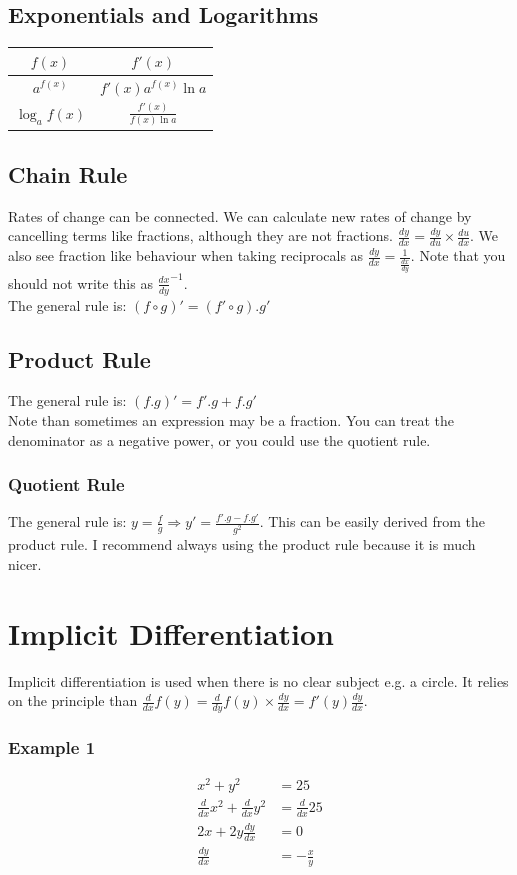 \documentclass[a4paper,12pt]{article}
\begin{document}
\subsection*{Exponentials and Logarithms}
\begin{tabular}{ c c }
\hline
	 $f(x)$ & $f'(x)$  \\ 
\hline
	$a^{f(x)}$ & $f'(x) a^{f(x)} \ln a$ \\
	$\log_a f(x)$ & $\frac{f'(x)}{f(x)\ln a}$	 \\
\hline
\end{tabular}
\subsection*{Chain Rule}
Rates of change can be connected. We can calculate new rates of change by cancelling terms like fractions, although they are not fractions. $\frac{dy}{dx} = \frac{dy}{du} \times \frac{du}{dx}$. We also see fraction like behaviour when taking reciprocals as $\frac{dy}{dx} = \frac{1}{\frac{dx}{dy}}$. Note that you should not write this as $\frac{dx}{dy}^{-1}$. \\
The general rule is: $(f \circ g)' = (f' \circ g).g'$
\subsection*{Product Rule}
The general rule is: $(f.g)' = f'.g + f.g'$ \\
Note than sometimes an expression may be a fraction. You can treat the denominator as a negative power, or you could use the quotient rule. 
\subsubsection*{Quotient Rule}
The general rule is: $y = \frac{f}{g} \Rightarrow y' = \frac{f'.g - f.g'}{g^2}$. This can be easily derived from the product rule. I recommend always using the product rule because it is much nicer. 

\section*{Implicit Differentiation}
Implicit differentiation is used when there is no clear subject e.g. a circle. It relies on the principle than $\frac{d}{dx}f(y) = \frac{d}{dy}f(y) \times \frac{dy}{dx} = f'(y) \frac{dy}{dx}$.
\subsubsection*{Example 1}
\begin{align*}
x^2 + y^2 & = 25 \\
\frac{d}{dx}x^2 + \frac{d}{dx}y^2 & = \frac{d}{dx}25 \\
2x + 2y \frac{dy}{dx} & = 0 \\
\frac{dy}{dx} & = -\frac{x}{y} \\
\end{align*}
\end{document}
